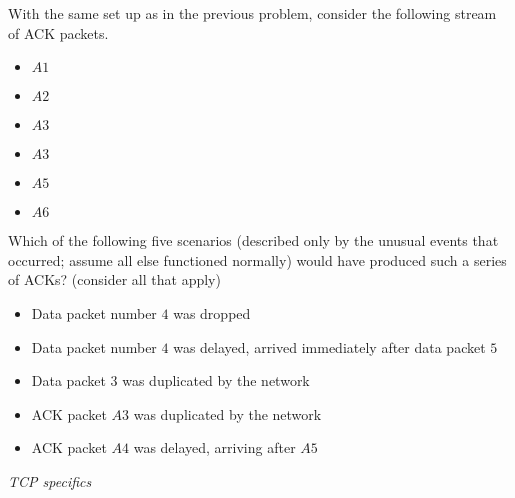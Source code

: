 \documentclass{supervision}
\begin{document}
\begin{questions}
\begin{parts}
\begin{subparts}
              \subpart With the same set up as in the previous problem,
                consider the following stream of ACK packets.

                \begin{itemize}
                  \item $A1$
                  \item $A2$
                  \item $A3$
                  \item $A3$
                  \item $A5$
                  \item $A6$
                \end{itemize}

                Which of the following five scenarios (described only by the
                unusual events that occurred; assume all else functioned
                normally) would have produced such a series of ACKs? (consider
                all that apply)

                \begin{itemize}
                  \item Data packet number $4$ was dropped
                  \item Data packet number $4$ was delayed, arrived immediately
                  after data packet $5$
                  \item Data packet $3$ was duplicated by the network
                  \item ACK packet $A3$ was duplicated by the network
                  \item ACK packet $A4$ was delayed, arriving after $A5$
                \end{itemize}
            \end{subparts}
        \end{parts}

      \question \textit{TCP specifics}
\end{questions}
\end{document}
